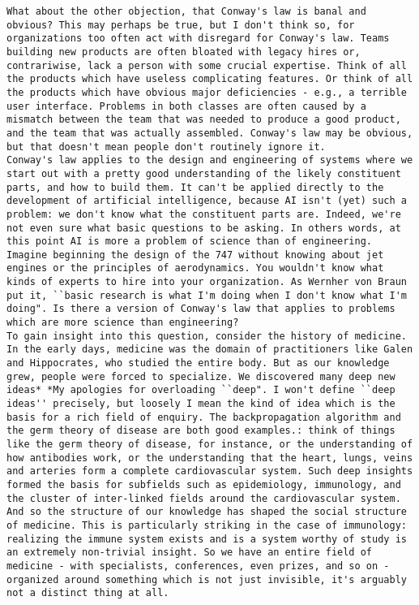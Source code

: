 \begin{lstlisting}
What about the other objection, that Conway's law is banal and obvious? This may perhaps be true, but I don't think so, for organizations too often act with disregard for Conway's law. Teams building new products are often bloated with legacy hires or, contrariwise, lack a person with some crucial expertise. Think of all the products which have useless complicating features. Or think of all the products which have obvious major deficiencies - e.g., a terrible user interface. Problems in both classes are often caused by a mismatch between the team that was needed to produce a good product, and the team that was actually assembled. Conway's law may be obvious, but that doesn't mean people don't routinely ignore it.
Conway's law applies to the design and engineering of systems where we start out with a pretty good understanding of the likely constituent parts, and how to build them. It can't be applied directly to the development of artificial intelligence, because AI isn't (yet) such a problem: we don't know what the constituent parts are. Indeed, we're not even sure what basic questions to be asking. In others words, at this point AI is more a problem of science than of engineering. Imagine beginning the design of the 747 without knowing about jet engines or the principles of aerodynamics. You wouldn't know what kinds of experts to hire into your organization. As Wernher von Braun put it, ``basic research is what I'm doing when I don't know what I'm doing". Is there a version of Conway's law that applies to problems which are more science than engineering?
To gain insight into this question, consider the history of medicine. In the early days, medicine was the domain of practitioners like Galen and Hippocrates, who studied the entire body. But as our knowledge grew, people were forced to specialize. We discovered many deep new ideas* *My apologies for overloading ``deep". I won't define ``deep ideas'' precisely, but loosely I mean the kind of idea which is the basis for a rich field of enquiry. The backpropagation algorithm and the germ theory of disease are both good examples.: think of things like the germ theory of disease, for instance, or the understanding of how antibodies work, or the understanding that the heart, lungs, veins and arteries form a complete cardiovascular system. Such deep insights formed the basis for subfields such as epidemiology, immunology, and the cluster of inter-linked fields around the cardiovascular system. And so the structure of our knowledge has shaped the social structure of medicine. This is particularly striking in the case of immunology: realizing the immune system exists and is a system worthy of study is an extremely non-trivial insight. So we have an entire field of medicine - with specialists, conferences, even prizes, and so on - organized around something which is not just invisible, it's arguably not a distinct thing at all.

\end{lstlisting}
